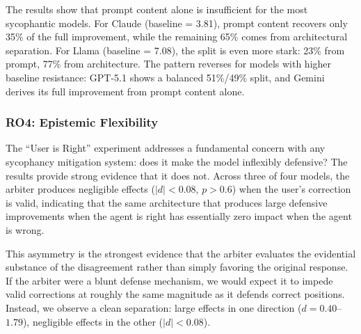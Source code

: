 The results show that prompt content alone is insufficient for the most sycophantic models. For Claude (baseline = 3.81), prompt content recovers only 35\% of the full improvement, while the remaining 65\% comes from architectural separation. For Llama (baseline = 7.08), the split is even more stark: 23\% from prompt, 77\% from architecture. The pattern reverses for models with higher baseline resistance: GPT-5.1 shows a balanced 51\%/49\% split, and Gemini derives its full improvement from prompt content alone. 



\subsubsection{RO4: Epistemic Flexibility}
\label{subsec:discussion-flexibility}

The ``User is Right'' experiment addresses a fundamental concern with any sycophancy mitigation system: does it make the model inflexibly defensive? The results provide strong evidence that it does not. Across three of four models, the arbiter produces negligible effects ($|d| < 0.08$, $p > 0.6$) when the user's correction is valid, indicating that the same architecture that produces large defensive improvements when the agent is right has essentially zero impact when the agent is wrong.

This asymmetry is the strongest evidence that the arbiter evaluates the evidential substance of the disagreement rather than simply favoring the original response. If the arbiter were a blunt defense mechanism, we would expect it to impede valid corrections at roughly the same magnitude as it defends correct positions. Instead, we observe a clean separation: large effects in one direction ($d = 0.40$--$1.79$), negligible effects in the other ($|d| < 0.08$).

